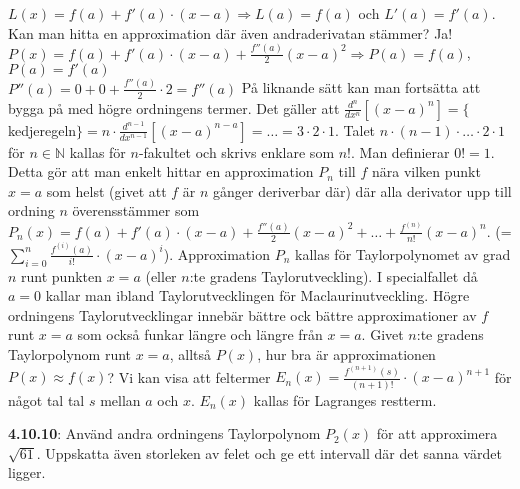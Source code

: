 $L(x)=f(a)+f'(a)\cdot(x-a)\Rightarrow L(a)=f(a)$ och $L'(a)=f'(a)$.
Kan man hitta en approximation där även andraderivatan stämmer? Ja!
$P(x)=f(a)+f'(a)\cdot(x-a)+\frac{f''(a)}{2}(x-a)^2\Rightarrow P(a)=f(a)$, $P(a)=f'(a)$\\
$P''(a)=0+0+\frac{f''(a)}{2}\cdot 2=f''(a)$
På liknande sätt kan man fortsätta att bygga på med högre ordningens termer.
Det gäller att $\frac{d^n}{dx^n}[(x-a)^n]=\{$kedjeregeln$\}=n\cdot\frac{d^{n-1}}{dx^{n-1}}[(x-a)^{n-a}]=\dots=3\cdot 2\cdot 1$.
Talet $n\cdot (n-1)\cdot\dots\cdot 2\cdot 1$ för $n\in\mathbb{N}$ kallas för $n$-fakultet och skrivs enklare som $n!$.
Man definierar $0!=1$.
Detta gör att man enkelt hittar en approximation $P_n$ till $f$ nära vilken punkt $x=a$ som helst (givet att $f$ är $n$ gånger deriverbar där)
där alla derivator upp till ordning $n$ överensstämmer som $P_n(x)=f(a)+f'(a)\cdot(x-a)+\frac{f''(a)}{2}(x-a)^2+\dots +\frac{f^{(n)}}{n!}(x-a)^n$.
(=$\sum^n_{i=0}\frac{f^{(i)}(a)}{i!}\cdot(x-a)^i$).
Approximation $P_n$ kallas för Taylorpolynomet av grad $n$ runt punkten $x=a$ (eller $n$:te gradens Taylorutveckling).
I specialfallet då $a=0$ kallar man ibland Taylorutvecklingen för Maclaurinutveckling.
Högre ordningens Taylorutvecklingar innebär bättre ock bättre approximationer av $f$ runt $x=a$ som också funkar längre och längre från $x=a$.
Givet $n$:te gradens Taylorpolynom runt $x=a$, alltså $P(x)$, hur bra är approximationen $P(x)\approx f(x)$?
Vi kan visa att feltermer $E_n(x)=\frac{f^{(n+1)}(s)}{(n+1)!}\cdot (x-a)^{n+1}$ för något tal tal $s$ mellan $a$ och $x$.
$E_n(x)$ kallas för Lagranges restterm.
\begin{epastel}
    \textbf{4.10.10}: Använd andra ordningens Taylorpolynom $P_2(x)$ för att approximera $\sqrt{61}$.
    Uppskatta även storleken av felet och ge ett intervall där det sanna värdet ligger.\\
\end{epastel}
